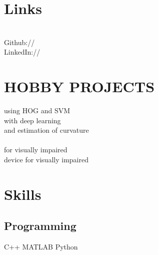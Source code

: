 \documentclass[]{resume-openfont}
\begin{document}
\begin{minipage}[t]{0.36\textwidth}
\section{Links}
\href{http://web.archive.org/web/20200803211659/http://tusharchugh.org/}{} \\
Github:// \href{https://github.com/tusharchugh}{} \\
LinkedIn://  \href{https://www.linkedin.com/in/tusharchugh}{} \\
\sectionsep


\section{HOBBY PROJECTS}
\href{https://github.com/TusharChugh/Vehicle-Detection-HOG}{} using HOG and SVM  \\
\href{https://github.com/TusharChugh/CarND-Behavioral-Cloning-P3} {} with deep learning \\
\href{https://github.com/TusharChugh/LaneFinding}{} and estimation of curvature \\
\href{https://drive.google.com/file/d/102fWGKxSgXCAuf71lqbMsWB5CRU4Gg99/view?usp=sharing}{} \\
\href{https://github.com/TusharChugh/SmartCap}{} for visually impaired \\
\href{https://www.youtube.com/watch?v=F2xGf-Cr6nI}{} device for visually impaired \\

\sectionsep
\section{Skills}
\subsection{Programming}
C++ \textbullet{} MATLAB \textbullet{} Python \\
\sectionsep

\end{minipage}
\end{document}

